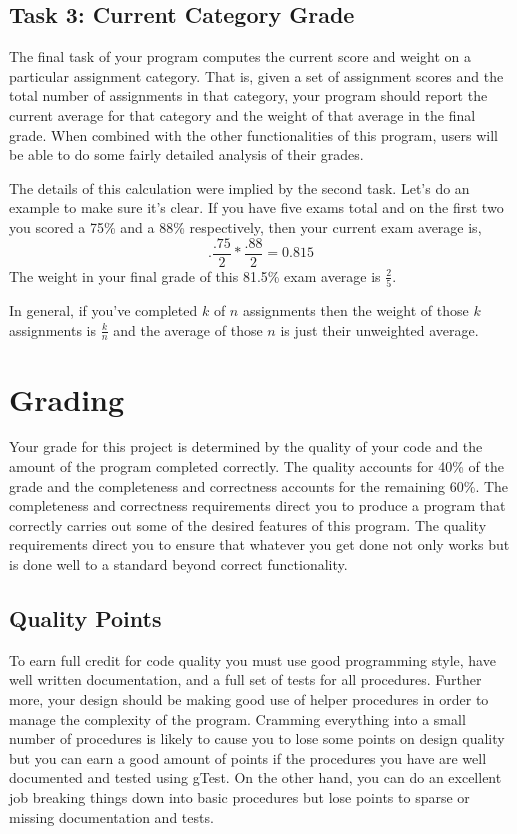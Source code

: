 \documentclass[]{tufte-handout}
\begin{document}
\subsection{Task 3: Current Category Grade}

The final task of your program computes the current score and weight on a particular assignment category. That is, given a set of assignment scores and the total number of assignments in that category, your program should report the current average for that category and the weight of that average in the final grade. When combined with the other functionalities of this program, users will be able to do some fairly detailed analysis of their grades.

The details of this calculation were implied by the second task. Let's do an example to make sure it's clear. If you have five exams total and on the first two you scored a 75\% and a 88\% respectively, then your current exam average is,
\[
  .\dfrac{.75}{2}*\dfrac{.88}{2} = 0.815
\]
The weight in your final grade of this 81.5\% exam average is $\frac{2}{5}$.

In general, if you've completed $k$ of $n$ assignments then the weight of those $k$ assignments is $\frac{k}{n}$ and the average of those $n$ is just their unweighted average.

\section{Grading}

Your grade for this project is determined by the quality of your code and the amount of the program completed correctly. The quality accounts for 40\% of the grade and the completeness and correctness accounts for the remaining 60\%.  The completeness and correctness requirements direct you to produce a program that correctly carries out some of the desired features of this program. The quality requirements direct you to ensure that whatever you get done not only works but is done well to a standard beyond correct functionality.

\subsection{Quality Points}

To earn full credit for code quality you must use good programming style, have well written documentation, and a full set of tests for all procedures. Further more, your design should be making good use of helper procedures in order to manage the complexity of the program. Cramming everything into a small number of procedures is likely to cause you to lose some points on design quality but you can earn a good amount of points if the procedures you have are well documented and tested using gTest. On the other hand, you can do an excellent job breaking things down into basic procedures but lose points to sparse or missing documentation and tests.
\end{document}
